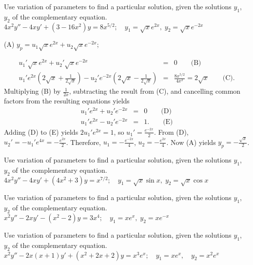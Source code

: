 \documentclass{ximera}
\begin{document}
\begin{problem}\label{exer:5.7.20}
Use variation
of parameters to find a particular solution, given the solutions
$y_1$, $y_2$ of the complementary equation. $4x^2y''-4xy'+(3-16x^2)y=8x^{5/2}; \quad  y_1=\sqrt xe^{2x},\;  y_2=\sqrt
xe^{-2x}$

\begin{solution}
(A) $y_p=u_1\sqrt xe^{2x}+u_2\sqrt xe^{-2x}$;

\begin{eqnarray*}
u_1'\sqrt xe^{2x}+u_2'\sqrt xe^{-2x}&=&0\qquad\text{(B)}\\ %
u_1'e^{2x}\left(2\sqrt x+\frac{1}{2\sqrt x}\right)-u_2'e^{-2x}
\left(2\sqrt x-\frac{1}{2\sqrt x}\right)&=&\frac{8x^{5/2}}{4x^2}
=2\sqrt x\qquad\text{(C)}. %
\end{eqnarray*}
Multiplying (B) by $\frac{1}{2x}$, subtracting the
result from (C), and cancelling common factors from
the resulting equations yields
\begin{eqnarray*}
u_1'e^{2x}+u_2'e^{-2x}&=&0\qquad\text{(D)}\\ %
u_1'e^{2x}-u_2'e^{-2x}&=&1.\qquad\text{(E)} %
\end{eqnarray*}
Adding (D) to (E) yields
$2u_1'e^{2x}=1$, so $u_1'=\frac{e^{-2x}}{2}$. From
(D), $u_2'=-u_1'e^{4x}=-\frac{e^{2x}}{2}$.
Therefore, $u_1=-\frac{e^{-2x}}{4}$, $u_2=-\frac{e^{2x}}{4}$. Now
(A) yields $y_p=-\frac{\sqrt x}{2}$.

\end{solution}
\end{problem}

\begin{problem}\label{exer:5.7.21}
Use variation
of parameters to find a particular solution, given the solutions
$y_1$, $y_2$ of the complementary equation. $4x^2y''-4xy'+(4x^2+3)y=x^{7/2}; \quad  y_1=\sqrt x\sin x,\;
y_2=\sqrt x\cos x$
\end{problem}

\begin{problem}\label{exer:5.7.22}
Use variation
of parameters to find a particular solution, given the solutions
$y_1$, $y_2$ of the complementary equation. $x^2y''-2xy'-(x^2-2)y=3x^4;\quad  y_1=xe^x,\;  y_2=xe^{-x}$
\end{problem}

\begin{problem}\label{exer:5.7.23}
Use variation
of parameters to find a particular solution, given the solutions
$y_1$, $y_2$ of the complementary equation. $x^2y''-2x(x+1)y' +(x^2+2x+2)y=x^3e^x;   \quad y_1=xe^x, \quad y_2=x^2e^x$
\end{problem}
\end{document}
